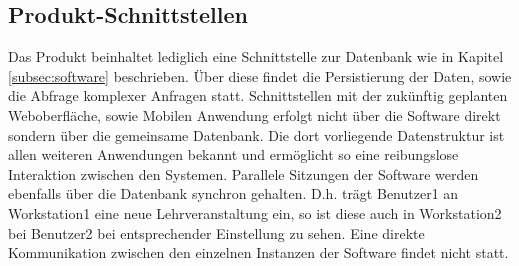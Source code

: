 \subsection{Produkt-Schnittstellen}

Das Produkt beinhaltet lediglich eine Schnittstelle zur Datenbank wie in Kapitel \ref{subsec:software} beschrieben. Über diese findet die Persistierung der Daten, sowie die Abfrage komplexer Anfragen statt.
Schnittstellen mit der zukünftig geplanten Weboberfläche, sowie Mobilen Anwendung erfolgt nicht über die Software direkt sondern über die gemeinsame Datenbank. Die dort vorliegende Datenstruktur ist allen weiteren Anwendungen bekannt und ermöglicht so eine reibungslose Interaktion zwischen den Systemen.
Parallele Sitzungen der Software werden ebenfalls über die Datenbank synchron gehalten. D.h. trägt Benutzer1 an Workstation1 eine neue Lehrveranstaltung ein, so ist diese auch in Workstation2 bei Benutzer2 bei entsprechender Einstellung zu sehen. Eine direkte Kommunikation zwischen den einzelnen Instanzen der Software findet nicht statt.
